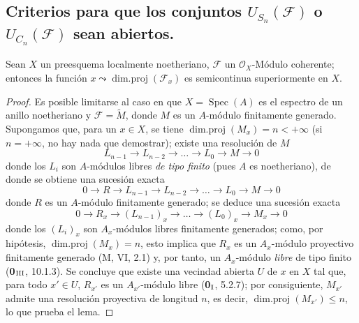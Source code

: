 \subsection{Criterios para que los conjuntos
$U_{S_n}(\mathcal F)$ o $U_{C_n}(\mathcal F)$ sean abiertos.}
\label{IV.2.s6.11-fr}

\begin{lemma}[6.11.1]
\label{IV.2.s6.11.1-fr}
Sean $X$ un preesquema localmente noetheriano, $\mathcal F$ un
$\mathcal O_X$-Módulo coherente; entonces la función
$x\leadsto\operatorname{dim.proj}(\mathcal F_x)$ es semicontinua
superiormente en $X$.
\end{lemma}

\begin{proof}
Es posible limitarse al caso en que $X=\operatorname{Spec}(A)$ es el espectro de un
anillo noetheriano y $\mathcal F=\widetilde M$, donde $M$ es un $A$-módulo
finitamente generado. Supongamos que, para un $x\in X$, se tiene
$\operatorname{dim.proj}(M_x)=n<+\infty$ (si $n=+\infty$, no hay nada que
demostrar); existe una resolución de $M$
\[
L_{n-1}\longrightarrow L_{n-2}\longrightarrow\ldots
\longrightarrow L_0\longrightarrow M\longrightarrow0
\]
donde los $L_i$ son $A$-módulos libres \emph{de tipo finito} (pues $A$ es
noetheriano), de donde se obtiene una sucesión exacta
\[
0\longrightarrow R\longrightarrow L_{n-1}\longrightarrow L_{n-2}
\longrightarrow\ldots\longrightarrow L_0\longrightarrow M
\longrightarrow0
\]
donde $R$ es un $A$-módulo finitamente generado; se deduce una sucesión exacta
\[
0\longrightarrow R_x\longrightarrow(L_{n-1})_x\longrightarrow\ldots
\longrightarrow(L_0)_x\longrightarrow M_x\longrightarrow0
\]
donde los $(L_i)_x$ son $A_x$-módulos libres finitamente generados; como, por
hipótesis, $\operatorname{dim.proj}(M_x)=n$, esto implica que $R_x$ es un
$A_x$-módulo proyectivo finitamente generado (M, VI, 2.1) y, por tanto, un
$A_x$-módulo \emph{libre} de tipo finito (\textbf{0}$_{\rm III}$, 10.1.3). Se concluye que
existe una vecindad abierta $U$ de $x$ en $X$ tal que, para todo
$x'\in U$, $R_{x'}$ es un $A_{x'}$-módulo libre (\textbf{0}$_{\rm I}$, 5.2.7);
por consiguiente, $M_{x'}$ admite una resolución proyectiva de longitud $n$, es decir,
$\operatorname{dim.proj}(M_{x'})\leq n$, lo que prueba el lema.
\end{proof}
